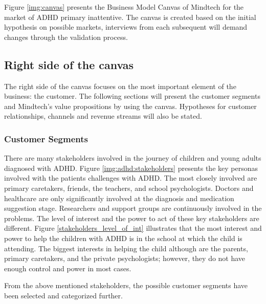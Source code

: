 \documentclass[letterpaper,10pt]{article}
\let\oldsubsection\subsection
\renewcommand{\subsection}{\def\cursectioning{subsection}\oldsubsection}
\begin{document}
Figure \ref{img:canvas} presents the Business Model Canvas of Mindtech for the market of ADHD primary inattentive. The canvas is created based on the initial hypothesis on possible markets, interviews from each subsequent will demand changes through the validation process. 


\subsection{Right side of the canvas}

The right side of the canvas focuses on the most important element of the business: the customer. The following sections will present the customer segments and Mindtech's value propositions by using the canvas. Hypotheses for customer relationships, channels and revenue streams will also be stated. 

\subsubsection{Customer Segments}

There are many stakeholders involved in the journey of children and young adults diagnosed with ADHD. Figure \ref{img:adhd:stakeholders} presents the key personas involved with the patients challenges with ADHD. The most closely involved are primary caretakers, friends, the teachers, and school psychologists. Doctors and healthcare are only significantly involved at the diagnosis and medication suggestion stage. Researchers and support groups are continuously involved in the problems. The level of interest and the power to act of these key stakeholders are different. Figure \ref{stakeholders_level_of_int} illustrates that the most interest and power to help the children with ADHD is in the school at which the child is attending. The biggest interests in helping the child although are the parents, primary caretakers, and the private psychologists; however, they do not have enough control and power in most cases.

From the above mentioned stakeholders, the possible customer segments have been selected and categorized further.
\end{document}
